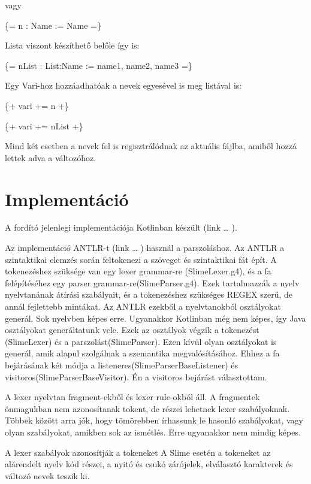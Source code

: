 {vagy

\{= n : Name := Name =\}

Lista viszont készíthető belőle így is:

\{= nList : List:Name := name1, name2, name3 =\}

Egy Vari-hoz hozzáadhatóak a nevek egyesével is meg listával is:

\{+ vari += n +\}

\{+ vari += nList +\}

Mind két esetben a nevek fel is regisztrálódnak az aktuális fájlba, amiből hozzá lettek adva a változóhoz.



\section{Implementáció}
A fordító jelenlegi implementációja Kotlinban készült (link … ).

Az implementáció ANTLR-t (link … ) használ a parszoláshoz. 
Az ANTLR a szintaktikai elemzés során feltokenezi a szöveget és szintaktikai fát épít. 
A tokenezéshez szüksége van egy lexer grammar-re (SlimeLexer.g4), és a fa felépítéséhez egy parser grammar-re(SlimeParser.g4). 
Ezek tartalmazzák a nyelv nyelvtanának átírási szabályait, és a tokenezéshez szükséges REGEX szerű, de annál fejlettebb mintákat. 
Az ANTLR ezekből a nyelvtanokból osztályokat generál. 
Sok nyelvben képes erre. 
Ugyanakkor Kotlinban még nem képes, így Java osztályokat generáltatunk vele. 
Ezek az osztályok végzik a tokenezést (SlimeLexer) és a parszolást(SlimeParser). 
Ezen kívül olyan osztályokat is generál, amik alapul szolgálnak a  szemantika megvalósításához. 
Ehhez a fa bejárásának két módja a listeneres(SlimeParserBaseListener) és visitoros(SlimeParserBaseVisitor).
Én a visitoros bejárást választottam. 

A lexer nyelvtan fragment-ekből és lexer rule-okból áll. 
A fragmentek önmagukban nem azonosítanak tokent, de részei lehetnek lexer szabályoknak. 
Többek között arra jók, hogy tömörebben írhassunk le hasonló szabályokat, vagy olyan szabályokat, amikben sok az ismétlés. 
Erre ugyanakkor nem mindig képes.

A lexer szabályok azonosítják a tokeneket
A Slime esetén a tokeneket az alárendelt nyelv kód részei, a nyitó és csukó zárójelek, elválasztó karakterek és változó nevek teszik ki.

}
